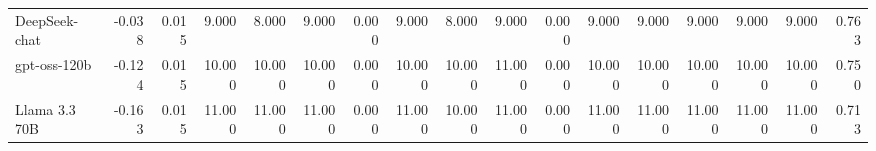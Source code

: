 \begin{landscape}
\begin{table}[htbp]
{\begin{tabular}{lrrrrrrrrrrrrrrrr}
DeepSeek-chat & -0.038 & 0.015 & 9.000 & 8.000 & 9.000 & 0.000 & 9.000 & 8.000 & 9.000 & 0.000 & 9.000 & 9.000 & 9.000 & 9.000 & 9.000 & 0.763 \\
gpt-oss-120b & -0.124 & 0.015 & 10.000 & 10.000 & 10.000 & 0.000 & 10.000 & 10.000 & 11.000 & 0.000 & 10.000 & 10.000 & 10.000 & 10.000 & 10.000 & 0.750 \\
Llama 3.3 70B & -0.163 & 0.015 & 11.000 & 11.000 & 11.000 & 0.000 & 11.000 & 10.000 & 11.000 & 0.000 & 11.000 & 11.000 & 11.000 & 11.000 & 11.000 & 0.713 \\
\bottomrule
\end{tabular}
}
\end{table}
\end{landscape}

